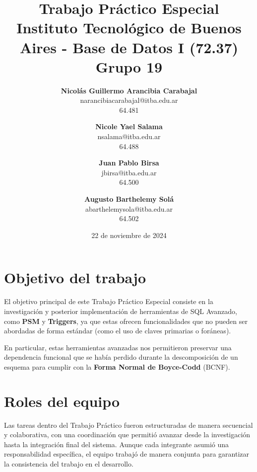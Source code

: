 \documentclass{article}
\title{
    {\Large\textbf{Trabajo Práctico Especial}}
    \vspace{1ex}
    \\{\normalsize Instituto Tecnológico de Buenos Aires - Base de Datos I (72.37)}
    \vspace{1ex}
    \\{\normalsize Grupo 19}
}
\date{22 de noviembre de 2024}
\author{
    \textbf{Nicolás Guillermo Arancibia Carabajal}\\
    narancibiacarabajal@itba.edu.ar\\
    64.481
    \and
    \textbf{Nicole Yael Salama}\\
    nsalama@itba.edu.ar\\
    64.488
    \and
    \textbf{Juan Pablo Birsa}\\
    jbirsa@itba.edu.ar\\
    64.500
    \and
    \textbf{Augusto Barthelemy Solá}\\
    abarthelemysola@itba.edu.ar\\
    64.502
}
\begin{document}
\maketitle

\section{Objetivo del trabajo}

El objetivo principal de este Trabajo Práctico Especial consiste en la investigación y posterior implementación de herramientas de SQL Avanzado, como \textbf{PSM} y \textbf{Triggers}, ya que estas ofrecen funcionalidades que no pueden ser abordadas de forma estándar (como el uso de claves primarias o foráneas).

En particular, estas herramientas avanzadas nos permitieron preservar una dependencia funcional que se había perdido durante la descomposición de un esquema para cumplir con la \textbf{Forma Normal de Boyce-Codd} (BCNF).

\section{Roles del equipo}

Las tareas dentro del Trabajo Práctico fueron estructuradas de manera secuencial y colaborativa, con una coordinación que permitió avanzar desde la investigación hasta la integración final del sistema. Aunque cada integrante asumió una responsabilidad específica, el equipo trabajó de manera conjunta para garantizar la consistencia del trabajo en el desarrollo.
\end{document}
